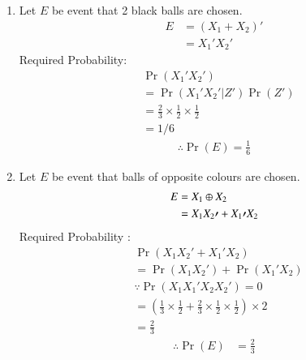 \documentclass[journal,12pt,twocolumn]{IEEEtran}
\providecommand{\pr}[1]{\ensuremath{\Pr\left(#1\right)}}
\begin{document}
% 		

 
\begin{enumerate}[label =(\alph*)]
\item Let $E$ be event that 2 black balls are chosen.
\begin{align}
E &= (X_1+X_2)\prime  \\
&= X_1\prime X_2\prime
\end{align}
Required Probability:
\begin{align}  
&\pr{X_1\prime X_2\prime} \\ \nonumber
&=\pr{X_1\prime X_2\prime | Z\prime}\pr{Z\prime} \\ \nonumber
&= \frac{2}{3}\times\frac{1}{2}\times\frac{1}{2} \\ \label{eq:1}
&= 1/6 
\end{align}
\begin{align}
\therefore \pr{E} = \frac{1}{6} 
\end{align}
\item Let $E$ be event that balls of opposite colours are chosen.
\begin{align}
E &= X_1 \oplus X_2 \\
&= X_1 X_2\prime + X_1\prime X_2
\end{align}
Required Probability : 
\begin{align}
&\pr{X_1 X_2\prime + X_1\prime X_2} \\
&=\pr{X_1 X_2\prime} + \pr{X_1\prime X_2} \\
&\because \pr{X_1 X_1 \prime X_2 X_2 \prime} = 0 \\
&=(\frac{1}{3}\times\frac{1}{2} + \frac{2}{3}\times\frac{1}{2}\times\frac{1}{2})\times 2 \\
&=\frac{2}{3}
\end{align}
\begin{align}
\therefore \pr{E} &= \frac{2}{3}
\end{align}
\end{enumerate}
\end{document}
